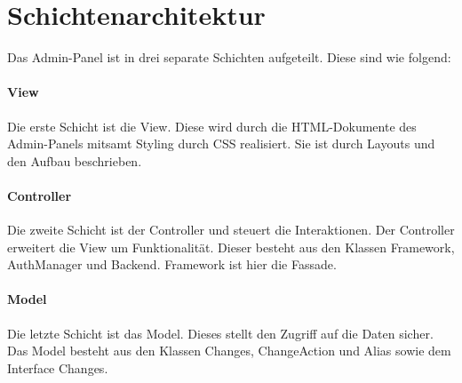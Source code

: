 \section{Schichtenarchitektur}

Das Admin-Panel ist in drei separate Schichten aufgeteilt. Diese sind wie folgend:

\paragraph*{View}
Die erste Schicht ist die View. Diese wird durch die HTML-Dokumente des Admin-Panels mitsamt Styling durch CSS realisiert.
Sie ist durch Layouts und den Aufbau beschrieben.

\paragraph*{Controller}
Die zweite Schicht ist der Controller und steuert die Interaktionen. Der Controller erweitert die View um Funktionalität. 
Dieser besteht aus den Klassen Framework, AuthManager und Backend. Framework ist hier die Fassade.

\paragraph*{Model}
Die letzte Schicht ist das Model. Dieses stellt den Zugriff auf die Daten sicher.
Das Model besteht aus den Klassen Changes, ChangeAction und Alias sowie dem Interface Changes.
